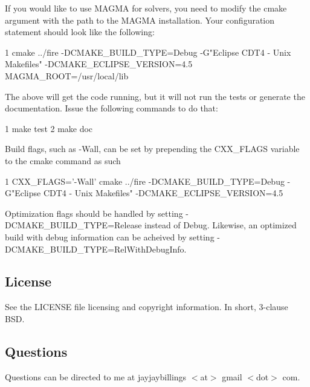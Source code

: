 If you would like to use M\+A\+G\+MA for solvers, you need to modify the cmake argument with the path to the M\+A\+G\+MA installation. Your configuration statement should look like the following\+:


\begin{DoxyCode}
1 cmake ../fire -DCMAKE\_BUILD\_TYPE=Debug -G"Eclipse CDT4 - Unix Makefiles" -DCMAKE\_ECLIPSE\_VERSION=4.5
       MAGMA\_ROOT=/usr/local/lib
\end{DoxyCode}


The above will get the code running, but it will not run the tests or generate the documentation. Issue the following commands to do that\+: 
\begin{DoxyCode}
1 make test
2 make doc
\end{DoxyCode}


Build flags, such as -\/\+Wall, can be set by prepending the C\+X\+X\+\_\+\+F\+L\+A\+GS variable to the cmake command as such


\begin{DoxyCode}
1 CXX\_FLAGS='-Wall' cmake ../fire -DCMAKE\_BUILD\_TYPE=Debug -G"Eclipse CDT4 - Unix Makefiles"
       -DCMAKE\_ECLIPSE\_VERSION=4.5
\end{DoxyCode}


Optimization flags should be handled by setting -\/\+D\+C\+M\+A\+K\+E\+\_\+\+B\+U\+I\+L\+D\+\_\+\+T\+Y\+PE=Release instead of Debug. Likewise, an optimized build with debug information can be acheived by setting -\/\+D\+C\+M\+A\+K\+E\+\_\+\+B\+U\+I\+L\+D\+\_\+\+T\+Y\+PE=Rel\+With\+Debug\+Info.

\subsection*{License}

See the L\+I\+C\+E\+N\+SE file licensing and copyright information. In short, 3-\/clause B\+SD.

\subsection*{Questions}

Questions can be directed to me at jayjaybillings $<$at$>$ gmail $<$dot$>$ com. 
